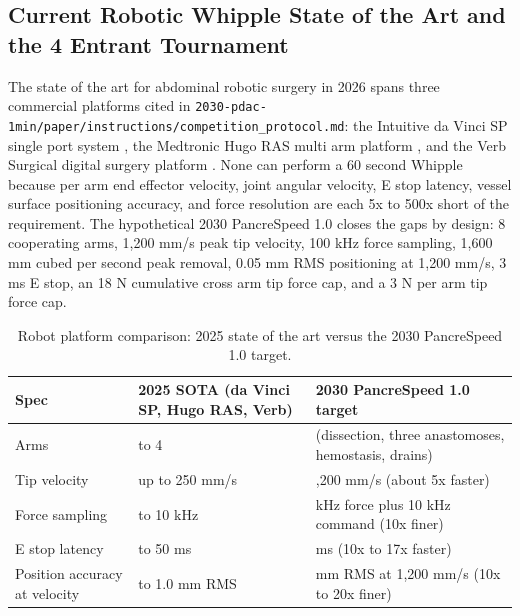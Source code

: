 \subsection{Current Robotic Whipple State of the Art and the 4 Entrant Tournament}
\label{sec:intro-baseline}

The state of the art for abdominal robotic surgery in 2026 spans
three commercial platforms cited in
\texttt{2030-pdac-1min/paper/instructions/competition_protocol.md}:
the Intuitive da Vinci SP single port system
\cite{intuitive-davinci-sp}, the Medtronic Hugo RAS multi arm
platform \cite{medtronic-hugo-ras}, and the Verb Surgical digital
surgery platform \cite{verb-surgical}. None can perform a 60
second Whipple because per arm end effector velocity, joint
angular velocity, E stop latency, vessel surface positioning
accuracy, and force resolution are each 5x to 500x short of the
requirement. The hypothetical 2030 PancreSpeed 1.0 closes the
gaps by design: 8 cooperating arms, 1,200 mm/s peak tip velocity,
100 kHz force sampling, 1,600 mm cubed per second peak removal,
0.05 mm RMS positioning at 1,200 mm/s, 3 ms E stop, an 18 N
cumulative cross arm tip force cap, and a 3 N per arm tip force
cap.

\begin{table}[H]
\caption{Robot platform comparison: 2025 state of the art versus the 2030 PancreSpeed 1.0 target.}
\label{tab:robot-comparison}
\centering
\begin{tabular}{>{\raggedright\arraybackslash}p{3.4cm} >{\raggedright\arraybackslash}p{4.6cm} >{\raggedright\arraybackslash}p{5.4cm}}
\toprule
\textbf{Spec} & \textbf{2025 SOTA (da Vinci SP, Hugo RAS, Verb)} & \textbf{2030 PancreSpeed 1.0 target} \\
\midrule
  Arms & 1 to 4 \cite{intuitive-davinci-sp, medtronic-hugo-ras, verb-surgical} & 8 (dissection, three anastomoses, hemostasis, drains) \\
  Tip velocity & up to 250 mm/s & 1,200 mm/s (about 5x faster) \\
  Force sampling & 1 to 10 kHz & 100 kHz force plus 10 kHz command (10x finer) \\
  E stop latency & 30 to 50 ms & 3 ms (10x to 17x faster) \\
  Position accuracy at velocity & 0.5 to 1.0 mm RMS & 0.05 mm RMS at 1,200 mm/s (10x to 20x finer) \\
\bottomrule
\end{tabular}
\end{table}

